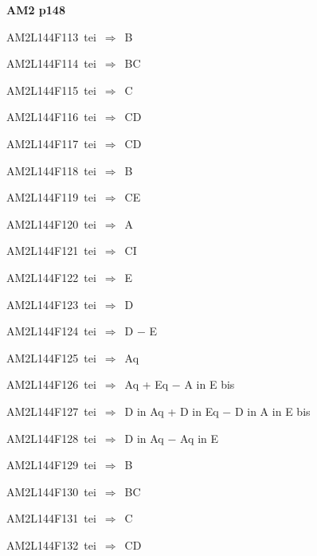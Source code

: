\par\vfill\eject
{\bf\hfill AM2 p148\hfill\hbox{}}\par\bigskip
{\sixrm AM2L144F113\ {\sixit tei}\ }$\Rightarrow$\ B\par\smallskip
{\sixrm AM2L144F114\ {\sixit tei}\ }$\Rightarrow$\ BC\par\smallskip
{\sixrm AM2L144F115\ {\sixit tei}\ }$\Rightarrow$\ C\par\smallskip
{\sixrm AM2L144F116\ {\sixit tei}\ }$\Rightarrow$\ CD\par\smallskip
{\sixrm AM2L144F117\ {\sixit tei}\ }$\Rightarrow$\ CD\par\smallskip
{\sixrm AM2L144F118\ {\sixit tei}\ }$\Rightarrow$\ {\tenit B}\par\smallskip
{\sixrm AM2L144F119\ {\sixit tei}\ }$\Rightarrow$\ CE\par\smallskip
{\sixrm AM2L144F120\ {\sixit tei}\ }$\Rightarrow$\ {\tenit A}\par\smallskip
{\sixrm AM2L144F121\ {\sixit tei}\ }$\Rightarrow$\ CI\par\smallskip
{\sixrm AM2L144F122\ {\sixit tei}\ }$\Rightarrow$\ {\tenit E}\par\smallskip
{\sixrm AM2L144F123\ {\sixit tei}\ }$\Rightarrow$\ {\tenit D}\par\smallskip
{\sixrm AM2L144F124\ {\sixit tei}\ }$\Rightarrow$\ {\tenit D} − {\tenit E}\par\smallskip
{\sixrm AM2L144F125\ {\sixit tei}\ }$\Rightarrow$\ {\tenit Aq}\par\smallskip
{\sixrm AM2L144F126\ {\sixit tei}\ }$\Rightarrow$\ {\tenit Aq} + {\tenit Eq} − {\tenit A} {\tenit in}
{\tenit E} {\tenit bis}\par\smallskip
{\sixrm AM2L144F127\ {\sixit tei}\ }$\Rightarrow$\ {\tenit D} {\tenit in} {\tenit Aq} + {\tenit D} {\tenit in}
{\tenit Eq} − {\tenit D} {\tenit in} {\tenit A} {\tenit in} {\tenit E} {\tenit bis}\par\smallskip
{\sixrm AM2L144F128\ {\sixit tei}\ }$\Rightarrow$\ {\tenit D} {\tenit in}
{\tenit Aq} − {\tenit Aq} {\tenit in} {\tenit E}\par\smallskip
{\sixrm AM2L144F129\ {\sixit tei}\ }$\Rightarrow$\ B\par\smallskip
{\sixrm AM2L144F130\ {\sixit tei}\ }$\Rightarrow$\ BC\par\smallskip
{\sixrm AM2L144F131\ {\sixit tei}\ }$\Rightarrow$\ C\par\smallskip
{\sixrm AM2L144F132\ {\sixit tei}\ }$\Rightarrow$\ CD\par\smallskip
